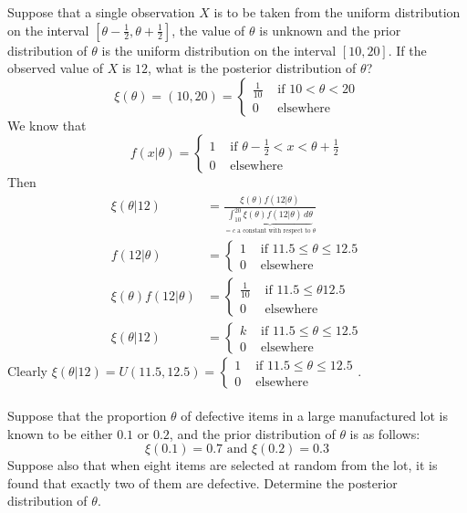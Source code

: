 \documentclass[12pt]{article}
\begin{document}
Suppose that a single observation $X$ is to be taken from the uniform distribution on the interval $[\theta - \frac{1}{2}, \theta + \frac{1}{2}]$, the value of $\theta$ is unknown and the prior distribution of $\theta$ is the uniform distribution on the interval $[10,20]$. If the observed value of $X$ is $12$, what is the posterior distribution of $\theta$? 
$$\xi(\theta) = (10,20) = \begin{cases} \frac{1}{10} &\text{ if } 10 < \theta < 20 \\ 0 &\text{ elsewhere} \end{cases} $$ 
We know that $$ f(x|\theta) = \begin{cases} 1 &\text{ if } \theta - \frac{1}{2} < x < \theta + \frac{1}{2} \\ 0 &\text{ elsewhere } \end{cases} $$ 
Then $$ \begin{aligned} \xi(\theta | 12) &= \frac{\xi(\theta) f(12|\theta)}{\underbrace{\int_{10}^{20} \xi(\theta) f(12|\theta) \, d\theta}_{= c \text{ a constant with respect to } \theta}} \\ f(12|\theta) &= \begin{cases} 1 &\text{ if } 11.5 \leq \theta \leq 12.5 \\ 0 &\text{ elsewhere} \end{cases} \\ \xi(\theta)f(12|\theta) &= \begin{cases} \frac{1}{10} &\text{ if } 11.5 \leq \theta 12.5 \\ 0 &\text{ elsewhere} \end{cases} \\ \xi(\theta| 12) &= \begin{cases} k &\text{ if } 11.5 \leq \theta \leq 12.5 \\ 0 &\text{ elsewhere} \end{cases} \end{aligned} $$ 
Clearly $\xi(\theta | 12) = U(11.5, 12.5) = \begin{cases} 1 &\text{ if } 11.5 \leq \theta \leq 12.5 \\ 0 &\text{ elsewhere} \end{cases}$. \\~\\
Suppose that the proportion $\theta$ of defective items in a large manufactured lot is known to be either $0.1$ or $0.2$, and the prior distribution of $\theta$ is as follows: $$ \xi(0.1) = 0.7 \text{  and  } \xi(0.2) = 0.3 $$ Suppose also that when eight items are selected at random from the lot, it is found that exactly two of them are defective. Determine the posterior distribution of $\theta$. 
\end{document}
